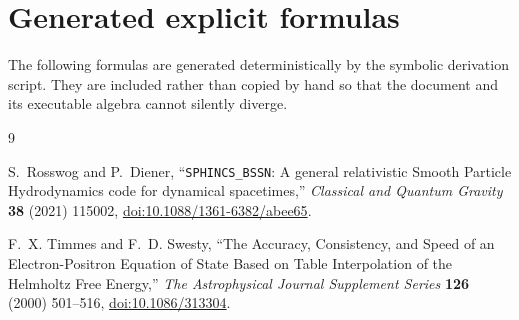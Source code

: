 \documentclass[11pt]{article}
\begin{document}
\appendix
\section{Generated explicit formulas}
\label{app:formulas}

The following formulas are generated deterministically by the symbolic
derivation script.  They are included rather than copied by hand so that the
document and its executable algebra cannot silently diverge.



\begin{thebibliography}{9}

S.~Rosswog and P.~Diener,
``\texttt{SPHINCS\_BSSN}: A general relativistic Smooth Particle
Hydrodynamics code for dynamical spacetimes,''
\emph{Classical and Quantum Gravity} \textbf{38} (2021) 115002,
\href{https://doi.org/10.1088/1361-6382/abee65}{doi:10.1088/1361-6382/abee65}.

F.~X. Timmes and F.~D. Swesty,
``The Accuracy, Consistency, and Speed of an Electron-Positron Equation of
State Based on Table Interpolation of the Helmholtz Free Energy,''
\emph{The Astrophysical Journal Supplement Series} \textbf{126} (2000)
501--516,
\href{https://doi.org/10.1086/313304}{doi:10.1086/313304}.

\end{thebibliography}
\end{document}
